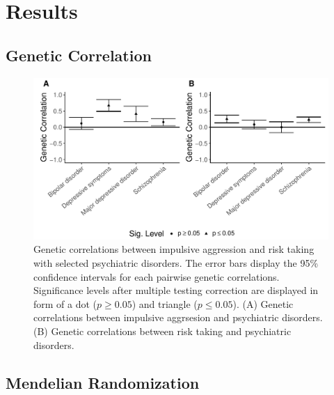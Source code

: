 \section{Results}
\label{sec:results}

\subsection{Genetic Correlation}
\label{sub:psych_genetic_correlation}





\begin{figure}[htpb]
  \centering
  \includegraphics[width=0.8\linewidth]{figures/combined_corr.pdf}
  \caption{Genetic correlations between impulsive aggression and risk taking with selected psychiatric disorders.
    The error bars display the 95\% confidence intervals for each pairwise genetic correlations.
    Significance levels after multiple testing correction are displayed in form of a dot ($p\ge 0.05$) and triangle ($p\leq0.05$).
    (A) Genetic correlations between impulsive aggrsesion and psychiatric disorders. 
    (B) Genetic correlations between risk taking and psychiatric disorders.
  }\label{fig:figures/combined_corr}
\end{figure}

\subsection{Mendelian Randomization}
\label{sub:mendelian_randomization}

